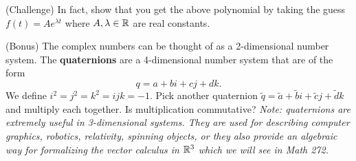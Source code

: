 \documentclass[12pt]{article} %
\begin{document}
\begin{problem} 
(Challenge) In fact, show that you get the above polynomial by taking the guess $f(t)=Ae^{\lambda t}$ where $A,\lambda \in \mathbb{R}$ are real constants.

\end{problem}

\begin{problem}
(Bonus) The complex numbers can be thought of as a 2-dimensional number system. The \textbf{quaternions} are a 4-dimensional number system that are of the form
\[
q = a+bi+cj+dk.
\]
We define $i^2=j^2=k^2=ijk=-1$. Pick another quaternion $\tilde{q}=\tilde{a}+\tilde{b}i+\tilde{c}j+\tilde{d}k$ and multiply each together. Is multiplication commutative? \emph{Note: quaternions are extremely useful in 3-dimensional systems. They are used for describing computer graphics, robotics, relativity, spinning objects, or they also provide an algebraic way for formalizing the vector calculus in $\mathbb{R}^3$ which we will see in Math 272.}
\end{problem}
\end{document}
